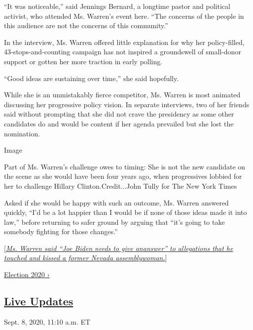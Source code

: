 ``It was noticeable,'' said Jennings Bernard, a longtime pastor and
political activist, who attended Ms. Warren's event here. ``The concerns
of the people in this audience are not the concerns of this community.''

In the interview, Ms. Warren offered little explanation for why her
policy-filled, 43-stops-and-counting campaign has not inspired a
groundswell of small-donor support or gotten her more traction in early
polling.

``Good ideas are sustaining over time,'' she said hopefully.

While she is an unmistakably fierce competitor, Ms. Warren is most
animated discussing her progressive policy vision. In separate
interviews, two of her friends said without prompting that she did not
crave the presidency as some other candidates do and would be content if
her agenda prevailed but she lost the nomination.

Image

Part of Ms. Warren's challenge owes to timing: She is not the new
candidate on the scene as she would have been four years ago, when
progressives lobbied for her to challenge Hillary Clinton.Credit...John
Tully for The New York Times

Asked if she would be happy with such an outcome, Ms. Warren answered
quickly, ``I'd be a lot happier than I would be if none of those ideas
made it into law,'' before returning to safer ground by arguing that
``it's going to take somebody fighting for those changes.''

{[}\href{https://www.nytimes3xbfgragh.onion/2019/03/30/us/politics/joe-biden-lucy-flores.html}{\emph{Ms.
Warren said ``Joe Biden needs to give ananswer'' to allegations that he
touched and kissed a former Nevada assemblywoman.}}{]}

\href{https://www.nytimes3xbfgragh.onion/news-event/2020-election}{Election
2020 ›}

\hypertarget{live-updates}{%
\subsection{\texorpdfstring{\href{https://www.nytimes3xbfgragh.onion/live/2020/09/08/us/trump-vs-biden}{Live
Updates}}{Live Updates}}\label{live-updates}}

\href{https://www.nytimes3xbfgragh.onion/live/2020/09/08/us/trump-vs-biden\#kathryn-garcia-nycs-sanitation-commissioner-resigns-to-mull-a-run-for-mayor}{}

Sept. 8, 2020, 11:10 a.m. ET

